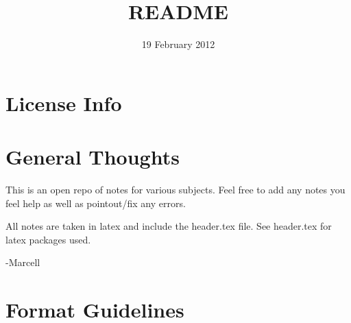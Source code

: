 \documentclass[11pt]{article}
\title{README}
\author{}
\date{19 February 2012}
\begin{document}
\maketitle

\setcounter{tocdepth}{3}
\tableofcontents
\vspace*{1cm}
\section{License Info}
\label{sec-1}

\section{General Thoughts}
\label{sec-2}

This is an open repo of notes for various subjects. Feel free to add any notes you feel help as well as pointout/fix any errors. 

All notes are taken in latex and include the header.tex file.
See header.tex for latex packages used.

-Marcell

\section{Format Guidelines}
\label{sec-3}
\end{document}
